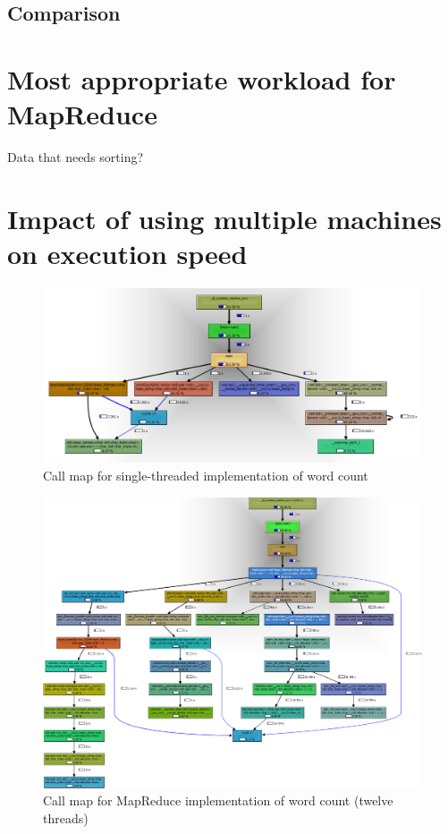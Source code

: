 \documentclass[12pt, letterpaper]{article}
\begin{document}
\subsection{Comparison}
	
\section{Most appropriate workload for MapReduce}
	Data that needs sorting?
\section{Impact of using multiple machines on execution speed}
	
\newpage
	\begin{figure}[h]
	\centering
	\includegraphics[width=1.35\textwidth, angle=90]{call-graph-part3-cropped}
	\caption{Call map for single-threaded implementation of word count}
	\end{figure}
\newpage
	\begin{figure}[h]
	\centering
	\includegraphics[width=1.35\textwidth, angle=90]{call-graph-part4-cropped}
	\caption{Call map for MapReduce implementation of word count (twelve threads)}
	\end{figure}
\end{document}
